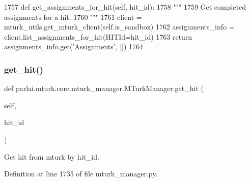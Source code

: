 \begin{DoxyCode}
1757     \textcolor{keyword}{def }get\_assignments\_for\_hit(self, hit\_id):
1758         \textcolor{stringliteral}{"""}
1759 \textcolor{stringliteral}{        Get completed assignments for a hit.}
1760 \textcolor{stringliteral}{        """}
1761         client = mturk\_utils.get\_mturk\_client(self.is\_sandbox)
1762         assignments\_info = client.list\_assignments\_for\_hit(HITId=hit\_id)
1763         \textcolor{keywordflow}{return} assignments\_info.get(\textcolor{stringliteral}{'Assignments'}, [])
1764 
\end{DoxyCode}
\mbox{\label{classparlai_1_1mturk_1_1core_1_1mturk__manager_1_1MTurkManager_ab4276a818e7845b08f9f4c08920050dc}} 
\subsubsection{\texorpdfstring{get\+\_\+hit()}{get\_hit()}}
{\footnotesize\ttfamily def parlai.\+mturk.\+core.\+mturk\+\_\+manager.\+M\+Turk\+Manager.\+get\+\_\+hit (\begin{DoxyParamCaption}\item[{}]{self,  }\item[{}]{hit\+\_\+id }\end{DoxyParamCaption})}

\begin{DoxyVerb}Get hit from mturk by hit_id.
\end{DoxyVerb}
 

Definition at line 1735 of file mturk\+\_\+manager.\+py.


